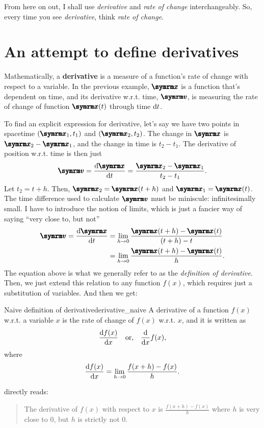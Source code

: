 From here on out, I shall use \emph{derivative} and \emph{rate of change} interchangeably. So, every time you see \emph{derivative}, think \emph{rate of change}.

\section{An attempt to define derivatives}

Mathematically, a \textbf{derivative} is a measure of a function's rate of change with respect to a variable. In the previous example, $\vv{x}$ is a function that's dependent on time, and its derivative w.r.t. time, $\vv{v}$, is measuring the rate of change of function $\vv{x}(t)$ through time $\odif{t}$.

To find an explicit expression for derivative, let's say we have two points in spacetime $(\vv{x}_1, t_1)$ and $(\vv{x}_2, t_2)$. The change in $\vv{x}$ is $\vv{x}_2 - \vv{x}_1$, and the change in time is $t_2 - t_1$. The derivative of position w.r.t. time is then just
\begin{equation}
    \vv{v} = \odv{\vv{x}}{t} = \frac{\vv{x}_2 - \vv{x}_1}{t_2 - t_1}. \label{eq:derivative1}
\end{equation}
Let $t_2 = t + h$. Then, $\vv{x}_2 = \vv{x}(t + h)$ and $\vv{x}_1 = \vv{x}(t)$. The time difference used to calculate $\vv{v}$ must be miniscule: infinitesimally small. I have to introduce the notion of limits, which is just a fancier way of saying ``very close to, but not''
\begin{align}
    \vv{v} = \odv{\vv{x}}{t} &= \lim_{h \appr 0}\frac{\vv{x}(t + h) - \vv{x}(t)}{(t + h) - t} \\
							 &= \lim_{h \appr 0}\frac{\vv{x}(t + h) - \vv{x}(t)}{h}.
\end{align}
The equation above is what we generally refer to as the \emph{definition of derivative}. Then, we just extend this relation to any function $f(x)$, which requires just a substitution of variables. And then we get:
\begin{df}{Naive definition of derivative}{derivative_naive}
    A derivative of a function $f(x)$ w.r.t. a variable $x$ is the rate of change of $f(x)$ w.r.t. $x$, and it is written as
    \begin{equation}
        \odv{f(x)}{x} \mathor \odv*{f(x)}{x},
    \end{equation}
    where
    \begin{equation}
        \odv{f(x)}{x} = \lim_{h \appr 0}\frac{f(x + h) - f(x)}{h}.\label{eq:naive_definition_of_derivative}
    \end{equation}
\end{df}
 directly reads:
\begin{quote}
    The derivative of $f(x)$ with respect to $x$ is $\frac{f(x + h) - f(x)}{h}$ where $h$ is very close to $0$, but $h$ is strictly not $0$.
\end{quote}

